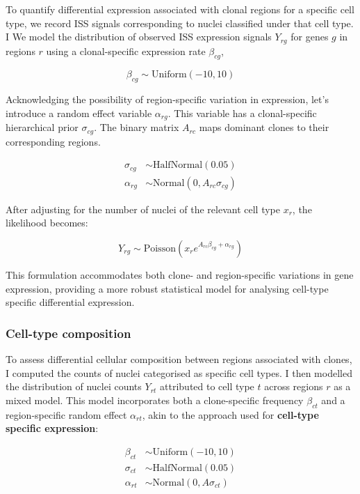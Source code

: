 To quantify differential expression associated with clonal regions for a specific cell type, we record \ac{ISS} signals corresponding to nuclei classified under that cell type. I We model the distribution of observed \ac{ISS} expression signals $Y_{rg}$ for genes $g$ in regions $r$ using a clonal-specific expression rate $\beta_{cg}$,

\begin{equation}
    \beta_{cg} \sim \text{Uniform}(-10,10)
\end{equation}

Acknowledging the possibility of region-specific variation in expression, let's introduce a random effect variable $\alpha_{rg}$. This variable has a clonal-specific hierarchical prior $\sigma_{cg}$. The binary matrix $A_{rc}$ maps dominant clones to their corresponding regions.

\begin{align}
    \sigma_{cg} &\sim \text{HalfNormal}(0.05) \\
    \alpha_{rg} &\sim \text{Normal}(0, A_{rc}\sigma_{cg})
\end{align}

After adjusting for the number of nuclei of the relevant cell type 
$x_r$, the likelihood becomes:

\begin{equation}
    Y_{rg} \sim \text{Poisson}\left(x_r e^{A_{rc}\beta_{cg} + \alpha_{rg}}\right)
\end{equation}
    
This formulation accommodates both clone- and region-specific variations in gene expression, providing a more robust statistical model for analysing cell-type specific differential expression.

\subsubsection*{Cell-type composition}

To assess differential cellular composition between regions associated with clones, I computed the counts of nuclei categorised as specific cell types. I then modelled the distribution of nuclei counts $Y_{rt}$ attributed to cell type $t$ across regions $r$ as a mixed model. This model incorporates both a clone-specific frequency $\beta_{ct}$ and a region-specific random effect $\alpha_{rt}$, akin to the approach used for \textbf{cell-type specific expression}:

\begin{align}
\beta_{ct} &\sim \text{Uniform}(-10, 10) \\
\sigma_{ct} &\sim \text{HalfNormal}(0.05) \\
\alpha_{rt} &\sim \text{Normal}(0, A\sigma_{ct})
\end{align}


